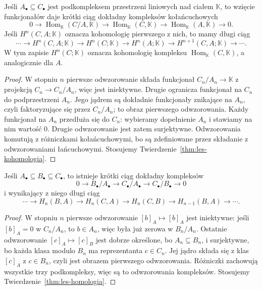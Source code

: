 \begin{stwierdzenie}
\label{prop:wzgledna-kohomologia}
Jeśli $A_\bullet\subseteq C_\bullet$
jest podkompleksem przestrzeni liniowych
nad ciałem $\mathbb K$, to wzięcie
funkcjonałów daje krótki ciąg dokładny
kompleksów kołańcuchowych
\[
 0\to\operatorname{Hom}_{\mathbb K}
      (C/A,\mathbb K)
 \to\operatorname{Hom}_{\mathbb K}(C,\mathbb K)
 \to\operatorname{Hom}_{\mathbb K}(A,\mathbb K)
 \to0.
\]
Jeśli $H^n(C,A;\mathbb K)$ oznacza
kohomologię pierwszego z nich, to mamy
długi ciąg
\[
 \cdots\to H^n(C,A;\mathbb K)\to H^n(C;\mathbb K)
 \to H^n(A;\mathbb K)\to H^{n+1}(C,A;\mathbb K)
 \to\cdots .
\]
W tym zapisie $H^n(C;\mathbb K)$
oznacza kohomologię kompleksu
$\operatorname{Hom}_{\mathbb K}(C,\mathbb K)$,
a analogicznie dla $A$.
\end{stwierdzenie}
\begin{proof}
W stopniu $n$ pierwsze odwzorowanie składa
funkcjonał $C_n/A_n\to\mathbb K$
z projekcją $C_n\to C_n/A_n$,
więc jest iniektywne.
Drugie ogranicza funkcjonał na $C_n$
do podprzestrzeni $A_n$.
Jego jądrem są dokładnie funkcjonały
znikające na $A_n$, czyli faktoryzujące
się przez $C_n/A_n$; to obraz
pierwszego odwzorowania. Każdy funkcjonał
na $A_n$ przedłuża się do $C_n$:
wybieramy dopełnienie $A_n$
i stawiamy na nim wartość $0$.
Drugie odwzorowanie jest zatem surjektywne.
Odwzorowania komutują z różniczkami
kołańcuchowymi, bo są zdefiniowane
przez składanie z odwzorowaniami łańcuchowymi.
Stosujemy
Twierdzenie~\ref{thm:les-kohomologia}.
\end{proof}

\begin{stwierdzenie}
\label{prop:les-potrojny}
Jeśli $A_\bullet\subseteq B_\bullet
\subseteq C_\bullet$, to istnieje
krótki ciąg dokładny kompleksów
\[
 0\longrightarrow B_\bullet/A_\bullet
 \longrightarrow C_\bullet/A_\bullet
 \longrightarrow C_\bullet/B_\bullet
 \longrightarrow0
\]
i wynikający z niego długi ciąg
\[
 \cdots\to H_n(B,A)\to H_n(C,A)\to H_n(C,B)
 \to H_{n-1}(B,A)\to\cdots.
\]
\end{stwierdzenie}
\begin{proof}
W stopniu $n$ pierwsze odwzorowanie
$[b]_A\mapsto[b]_A$ jest iniektywne:
jeśli $[b]_A=0$ w $C_n/A_n$, to
$b\in A_n$, więc była już zerowa w
$B_n/A_n$. Ostatnie odwzorowanie
$[c]_A\mapsto[c]_B$ jest dobrze
określone, bo $A_n\subseteq B_n$,
i surjektywne, bo każda klasa modulo
$B_n$ ma reprezentanta $c\in C_n$.
Jej jądro składa się z klas
$[c]_A$ z $c\in B_n$, czyli jest
obrazem pierwszego odwzorowania.
Różniczki zachowują wszystkie trzy
podkompleksy, więc są to odwzorowania
kompleksów. Stosujemy
Twierdzenie~\ref{thm:les-homologia}.
\end{proof}

